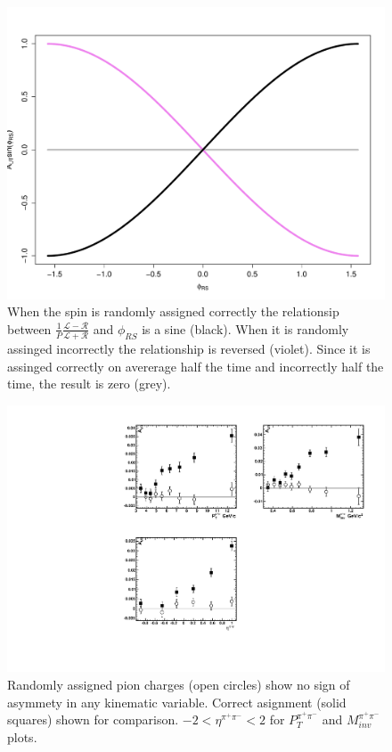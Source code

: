 \documentclass[abstract = on,listof=totoc, bibliography=totoc]{scrreprt}
\newcommand{\phirs}{\phi_{RS}}
\newcommand{\ptpair}{P_{T}^{\pi^+\pi^-}}
\newcommand{\mpair}{M_{inv}^{\pi^+\pi^-}}
\newcommand{\etapair}{\eta^{\pi^+\pi^-}}
\newcommand{\pip}{\pi^+}
\newcommand{\pim}{\pi^-}
\newcommand{\pair}{$\pip\pim$ }
\begin{document}
\begin{figure}
\begin{center}
\includegraphics[width = .5\textwidth]{sinminussin}
\caption[Need name here]{When the spin is randomly assigned correctly the relationsip between $\frac{1}{P}\frac{\mathcal{L} - \mathcal{R}}{\mathcal{L} + \mathcal{R}}$ and $\phirs$ is a sine (black). When it is randomly assinged incorrectly the relationship is reversed (violet). Since it is assinged correctly on avererage half the time and incorrectly half the time, the result is zero (grey).}
\label{fig:sinminussin}
\end{center}
\end{figure}

\begin{figure}
\begin{center}
\includegraphics[width = 1\textwidth]{randomSpin}
\caption[Asymmetry in \pair pair with randomly assigned charges]{Randomly assigned pion charges (open circles) show no sign of asymmety in any kinematic variable. Correct asignment (solid squares) shown for comparison. $-2<\etapair<2$ for $\ptpair$ and $\mpair$ plots.}
\label{fig:randomSpin}
\end{center}
\end{figure}
\end{document}
